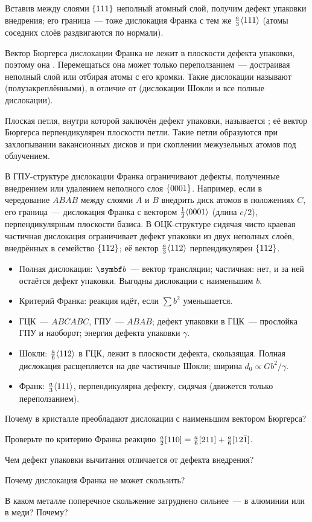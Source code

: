 Вставив между слоями $\{111\}$ неполный атомный слой, получим дефект
упаковки внедрения; его граница~— тоже дислокация Франка с тем же
$\frac a3\langle 111\rangle$ (атомы соседних слоёв раздвигаются по нормали).

\begin{glavnoe}
Вектор Бюргерса дислокации Франка не лежит в плоскости дефекта упаковки,
поэтому она . Перемещаться она может только
переползанием~— достраивая неполный слой или отбирая атомы с его кромки.
Такие дислокации называют  (полузакреплёнными), в отличие
от  (дислокации Шокли и все полные дислокации).
\end{glavnoe}

Плоская петля, внутри которой заключён дефект упаковки, называется
; её вектор Бюргерса перпендикулярен плоскости
петли. Такие петли образуются при захлопывании вакансионных дисков и при
скоплении межузельных атомов под облучением.

В ГПУ-структуре дислокации Франка ограничивают дефекты, полученные
внедрением или удалением неполного слоя $\{0001\}$. Например, если в
чередование $ABAB$ между слоями $A$ и $B$ внедрить диск атомов в
положениях $C$, его граница~— дислокация Франка с вектором
$\frac12\langle 0001\rangle$ (длина $c/2$), перпендикулярным плоскости базиса. В
ОЦК-структуре сидячая чисто краевая частичная дислокация ограничивает
дефект упаковки из двух неполных слоёв, внедрённых в семейство
$\{112\}$; её вектор $\frac a3\langle 112\rangle$ перпендикулярен $\{112\}$.

\begin{itogi}
\begin{itemize}
\item Полная дислокация: $\vb b$~— вектор трансляции; частичная: нет, и
за ней остаётся дефект упаковки. Выгодны дислокации с наименьшим $b$.
\item Критерий Франка: реакция идёт, если $\sum b^2$ уменьшается.
\item ГЦК~— $ABCABC$, ГПУ~— $ABAB$; дефект упаковки в ГЦК~— прослойка
ГПУ и наоборот; энергия дефекта упаковки $\gamma$.
\item Шокли: $\frac a6\langle 112\rangle$ в ГЦК, лежит в плоскости дефекта,
скользящая. Полная дислокация расщепляется на две частичные Шокли; ширина
$d_0\propto Gb^2/\gamma$.
\item Франк: $\frac a3\langle 111\rangle$, перпендикулярна дефекту, сидячая
(движется только переползанием).
\end{itemize}
\end{itogi}

\begin{proverka}
\item Почему в кристалле преобладают дислокации с наименьшим вектором
Бюргерса?
\item Проверьте по критерию Франка реакцию $\frac a2[110]=\frac a6[211]+\frac a6[12\bar{1}]$.
\item Чем дефект упаковки вычитания отличается от дефекта внедрения?
\item Почему дислокация Франка не может скользить?
\item В каком металле поперечное скольжение затруднено сильнее~— в
алюминии или в меди? Почему?
\end{proverka}
